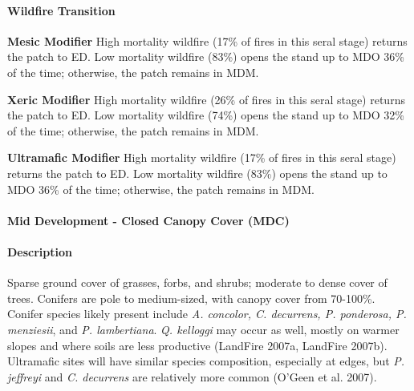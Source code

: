 \paragraph{Wildfire Transition}
\begin{adjustwidth}{2cm}{}
\textbf{Mesic Modifier } High mortality wildfire (17\% of fires in this seral stage) returns the patch to ED. Low mortality wildfire (83\%) opens the stand up to MDO 36\% of the time; otherwise, the patch remains in MDM. 

\medskip
\noindent \textbf{Xeric Modifier}  High mortality wildfire (26\% of fires in this seral stage) returns the patch to ED. Low mortality wildfire (74\%) opens the stand up to MDO 32\% of the time; otherwise, the patch remains in MDM.

\medskip
\noindent \textbf{Ultramafic Modifier} High mortality wildfire (17\% of fires in this seral stage) returns the patch to ED. Low mortality wildfire (83\%) opens the stand up to MDO 36\% of the time; otherwise, the patch remains in MDM.

\end{adjustwidth}

\noindent\hrulefill

\paragraph{Mid Development - Closed Canopy Cover (MDC)}

\paragraph{Description} Sparse ground cover of grasses, forbs, and shrubs; moderate to dense cover of trees. Conifers are pole to medium-sized, with canopy cover from 70-100\%. Conifer species likely present include \emph{A. concolor, C. decurrens, P. ponderosa, P. menziesii}, and \emph{P. lambertiana}. \emph{Q. kelloggi} may occur as well, mostly on warmer slopes and where soils are less productive (LandFire 2007a, LandFire 2007b). Ultramafic sites will have similar species composition, especially at edges, but \emph{P. jeffreyi} and \emph{C. decurrens} are relatively more common (O'Geen et al. 2007).

